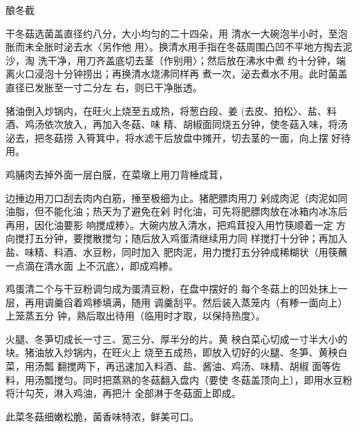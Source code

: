 \begin{recipe}{酿冬截}

\ingredients


\cooking

\step 	干冬菇选菌盖直径约八分，大小均匀的二十四朵，用 清水一大碗泡半小时，至泡胀而未全胀时泌去水〈另作他 用〉。换清水用手指在冬菇周围凸凹不平地方掏去泥沙，淘 洗干净，用刀齐盖底切去茎〔作别用〉；然后放在沸水中煮 约十分钟，端离火口浸泡十分钟捞出；再换清水烧沸同样再 煮一次，泌去煮水不用。此时菌盖直径已发胀至一寸二分左 右，则已干净胀透。

猪油倒入炒锅内，在旺火上烧至五成热，将葱白段、姜 (去皮、拍松〉、盐、料酒、鸡汤依次放入，再加入冬菇、味 精、胡椒面同烧五分钟，使冬菇入味，将汤泌去，把冬菇捞 入筲箕中，将水滤干后放盘中摊开，切去茎的一面，向上摆 好待用。

\step 	鸡脯肉去掉外面一层白膜，在菜墩上用刀背棰成茸，

边捶边用刀口刮去肉内白筋，捶至极细为止。猪肥膘肉用刀 剁成肉泥（肉泥如同油脂，但不能化油；热天为了避免在剁 时化油，可先将肥膘肉放在冰箱内冰冻后再用，因化油要影 响搅成糁〉。大碗内放入清水，把鸡茸投入用竹筷顺着一定 方向搅打五分钟，要搅散搅匀；随后放入鸡蛋清继续用力同 样搅打十分钟；再加入盐、味精、料酒、水豆粉，同时加入 肥肉泥，用力搅打五分钟成稀糊状（用筷蘸一点滴在清水面 上不沉底〉，即成鸡糁。

鸡蛋清二个与干豆粉调匀成为蛋清豆粉，在盘中摆好的 每个冬菇上的凹处抹上一层，再用调羹舀着鸡糁填满，随用 调羹刮平。然后装入蒸笼内（有糁一面向上）上笼蒸五分 钟，熟后取出待用（临用时才取，以保持热度〉。

\step 火腿、冬笋切成长一寸三、宽三分、厚半分的片。黄 秧白菜心切成一寸半大小的块。猪油放入炒锅内，在旺火上 烧至五成热，即放入切好的火腿、冬笋、黄秧白菜，用汤瓢 翻搅两下，再迅速加入料酒、盐、酱油、鸡汤、味精、胡椒 面等佐料，用汤瓢搅匀。同时把蒸熟的冬菇翻入盘内（要使 冬菇盖顶向上〕，即用水豆粉将汁勾芡，淋入鸡油，再把汁 全部淋于冬菇面上即成。

\notes

此菜冬菇细嫩松脆，菌香味特浓，鲜美可口。

\end{recipe}

